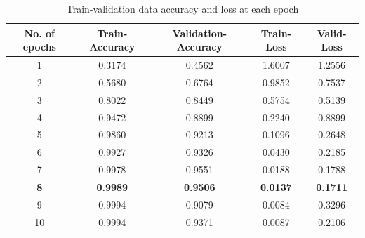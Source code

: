 \documentclass[a4paper,4pt]{article}
\begin{document}
\begin{center}
    \begin{table}[h!]
        \centering
        \begin{tabular}{|c|c|c|c|c|}
            \hline
            \textbf{No. of epochs}& \textbf{Train-Accuracy} & \textbf{Validation-Accuracy} & \textbf{Train-Loss} & \textbf{Valid-Loss} \\
            \hline
            1 & 0.3174 & 0.4562 & 1.6007 & 1.2556 \\
            \hline
            2 & 0.5680 & 0.6764 & 0.9852 & 0.7537 \\
            \hline
            3 & 0.8022 & 0.8449 & 0.5754 & 0.5139 \\
            \hline
            4 & 0.9472 & 0.8899 & 0.2240 & 0.8899 \\
            \hline
            5 & 0.9860 & 0.9213 & 0.1096 & 0.2648 \\
            \hline
            6 & 0.9927 & 0.9326 & 0.0430 & 0.2185 \\
            \hline
            7 & 0.9978 & 0.9551 & 0.0188 & 0.1788 \\
            \hline
            \textbf{8} & \textbf{0.9989} & \textbf{0.9506} & \textbf{0.0137} & \textbf{0.1711} \\
            \hline
            9 & 0.9994 & 0.9079 & 0.0084 & 0.3296 \\
            \hline
            10 & 0.9994 & 0.9371 & 0.0087 & 0.2106 \\
            \hline
        \end{tabular}
        \caption{Train-validation data accuracy and loss at each epoch}
        \label{table:epochtable}
    \end{table}
\end{center}
\newpage
\end{document}
